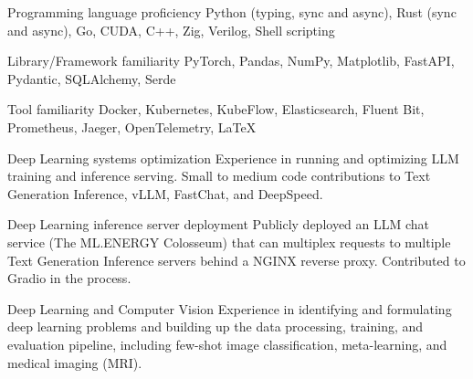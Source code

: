 

\begin{cvlist}

  \cvlistitem
    {Programming language proficiency} %
    {Python (typing, sync and async), Rust (sync and async), Go, CUDA, C++, Zig, Verilog, Shell scripting} %

  \cvlistitem
    {Library/Framework familiarity} %
    {PyTorch, Pandas, NumPy, Matplotlib, FastAPI, Pydantic, SQLAlchemy, Serde} %

  \cvlistitem
    {Tool familiarity} %
    {Docker, Kubernetes, KubeFlow, Elasticsearch, Fluent Bit, Prometheus, Jaeger, OpenTelemetry, LaTeX} %

  \cvlistitem
    {Deep Learning systems optimization} %
    {Experience in running and optimizing LLM training and inference serving. Small to medium code contributions to Text Generation Inference, vLLM, FastChat, and DeepSpeed.} %

  \cvlistitem
    {Deep Learning inference server deployment} %
    {Publicly deployed an LLM chat service (The ML.ENERGY Colosseum) that can multiplex requests to multiple Text Generation Inference servers behind a NGINX reverse proxy. Contributed to Gradio in the process.} %

  \cvlistitem
    {Deep Learning and Computer Vision} %
    {Experience in identifying and formulating deep learning problems and building up the data processing, training, and evaluation pipeline, including few-shot image classification, meta-learning, and medical imaging (MRI).} %

\end{cvlist}
